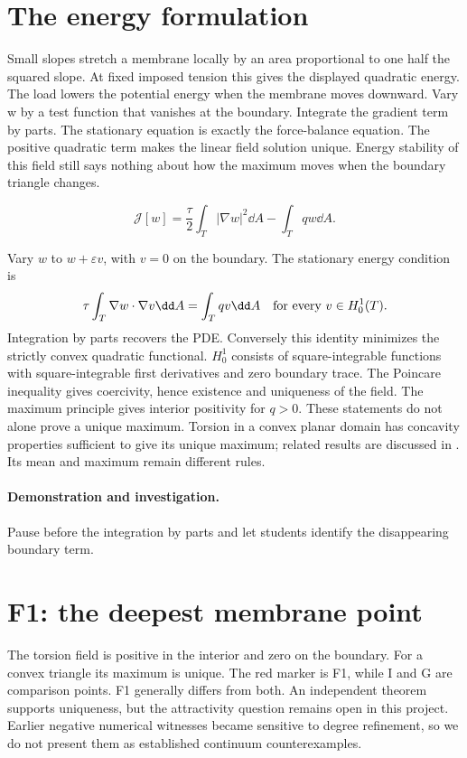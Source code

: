 \documentclass[11pt,oneside,openany]{book}
\begin{document}
\section{The energy formulation}\label{sec:slide34}

Small slopes stretch a membrane locally by an area proportional to one half the squared slope. At fixed imposed tension this gives the displayed quadratic energy. The load lowers the potential energy when the membrane moves downward. Vary w by a test function that vanishes at the boundary. Integrate the gradient term by parts. The stationary equation is exactly the force-balance equation. The positive quadratic term makes the linear field solution unique. Energy stability of this field still says nothing about how the maximum moves when the boundary triangle changes.


\[\mathcal J[w]=\frac{\tau}{2}\int_T|\nabla w|^2\dd A-\int_Tqw\dd A.\]



Vary $w$ to $w+\varepsilon v$, with $v=0$ on the boundary.
The stationary energy condition is
\[
\tau\int_T\nabla w\cdot\nabla v\dd A=\int_Tqv\dd A
\quad\hbox{for every }v\in H_0^1(T).
\]
Integration by parts recovers the PDE. Conversely this identity
minimizes the strictly convex quadratic functional.
$H_0^1$ consists of square-integrable functions with square-integrable
first derivatives and zero boundary trace. The Poincare inequality
gives coercivity, hence existence and uniqueness of the field.
The maximum principle gives interior positivity for $q>0$.
These statements do not alone prove a unique maximum.
Torsion in a convex planar domain has concavity properties sufficient
to give its unique maximum; related results are discussed in
\cite{torsion}. Its mean and maximum remain different rules.




\paragraph{Demonstration and investigation.} Pause before the integration by parts and let students identify the disappearing boundary term.


\section{F1: the deepest membrane point}\label{sec:slide35}

The torsion field is positive in the interior and zero on the boundary. For a convex triangle its maximum is unique. The red marker is F1, while I and G are comparison points. F1 generally differs from both. An independent theorem supports uniqueness, but the attractivity question remains open in this project. Earlier negative numerical witnesses became sensitive to degree refinement, so we do not present them as established continuum counterexamples.
\end{document}
